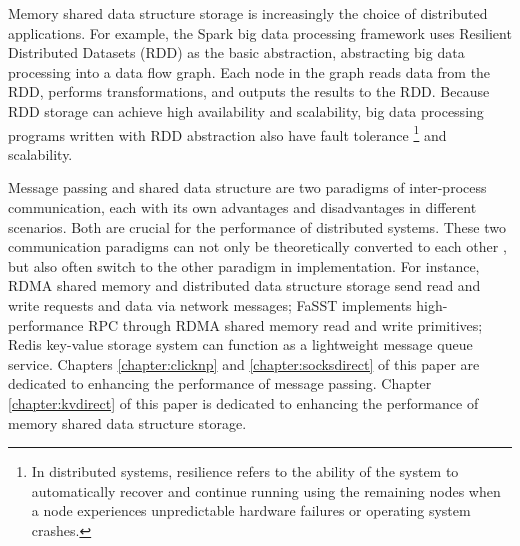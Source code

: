 Memory shared data structure storage is increasingly the choice of distributed applications.
For example, the Spark \cite{zaharia2010spark} big data processing framework uses Resilient Distributed Datasets (RDD) as the basic abstraction, abstracting big data processing into a data flow graph. Each node in the graph reads data from the RDD, performs transformations, and outputs the results to the RDD. Because RDD storage can achieve high availability and scalability, big data processing programs written with RDD abstraction also have fault tolerance \footnote{In distributed systems, resilience refers to the ability of the system to automatically recover and continue running using the remaining nodes when a node experiences unpredictable hardware failures or operating system crashes.} and scalability.

Message passing and shared data structure are two paradigms of inter-process communication, each with its own advantages and disadvantages in different scenarios. Both are crucial for the performance of distributed systems. These two communication paradigms can not only be theoretically converted to each other \cite{attiya1995sharing}, but also often switch to the other paradigm in implementation. For instance, RDMA shared memory and distributed data structure storage send read and write requests and data via network messages; FaSST \cite{kalia2016fasst} implements high-performance RPC through RDMA shared memory read and write primitives; Redis \cite{redis} key-value storage system can function as a lightweight message queue service. Chapters \ref{chapter:clicknp} and \ref{chapter:socksdirect} of this paper are dedicated to enhancing the performance of message passing. Chapter \ref{chapter:kvdirect} of this paper is dedicated to enhancing the performance of memory shared data structure storage.

